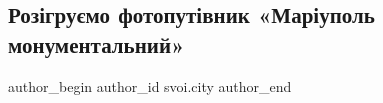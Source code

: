  
 
 
 
 

\subsection{Розігруємо фотопутівник «Маріуполь монументальний»}
\label{sec:05_10_2022.fb.svoi.city.1.roz_gru_mo_fotoput_v}

\ifcmt
 author_begin
   author_id svoi.city
 author_end
\fi
